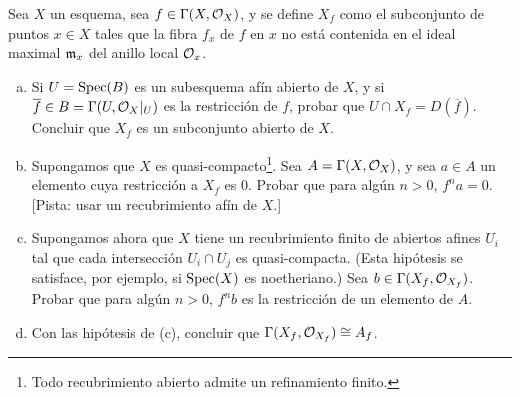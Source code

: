\documentclass[twoside]{article}
\begin{document}
%
%
%
%
%
%
\begin{ejercicio}{2.16}
Sea $X$ un esquema, sea $f\in\Gamma(X,{\mathcal O}_X)$, y se define $X_f$ como el subconjunto de puntos $x\in X$ tales que la fibra $f_x$ de $f$ en $x$ no está contenida en el ideal maximal $\mathfrak{m}_x$ del anillo local ${\mathcal O}_{x}$. 
\begin{enumerate}[(a)]
\item Si $U=\operatorname{Spec}(B)$ es un subesquema afín abierto de $X$, y si $\overline{f}\in B=\Gamma(U,{\mathcal O}_X|_U)$ es la restricción de $f$, probar que $U\cap X_f=D(\overline{f})$. Concluir que $X_f$ es un subconjunto abierto de $X$. 
\item Supongamos que $X$ es quasi-compacto\footnote{Todo recubrimiento abierto admite un refinamiento finito.}. Sea $A=\Gamma(X,{\mathcal O}_X)$, y sea $a\in A$ un elemento cuya restricción a $X_f$ es 0. Probar que para algún $n>0$, $f^na=0$. [Pista: usar un recubrimiento afín de $X$.]
\item Supongamos ahora que $X$ tiene un recubrimiento finito de abiertos afines $U_i$ tal que cada intersección $U_i\cap U_j$ es quasi-compacta. (Esta hipótesis se satisface, por ejemplo, si $\operatorname{Spec}(X)$ es noetheriano.) Sea $b\in\Gamma(X_f,{\mathcal O}_{X_f})$. Probar que para algún $n>0$, $f^nb$ es la restricción de un elemento de $A$.
\item Con las hipótesis de (c), concluir que $\Gamma(X_f,{\mathcal O}_{X_f})\cong A_f$.
\end{enumerate}
\end{ejercicio}
\end{document}
